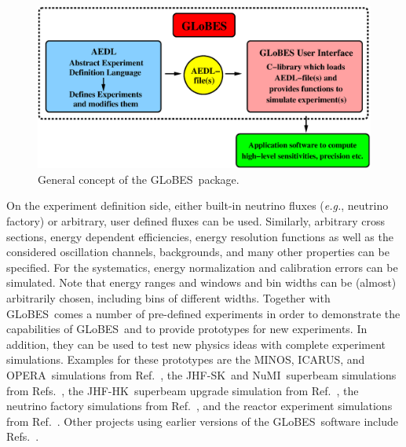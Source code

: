 \documentclass[12pt,a4paper]{article}
\newcommand{\eg}{{\it e.g.}}
\newcommand{\Ref}{Ref.}
\newcommand{\Refs}{Refs.}
\newcommand{\MINOS}{{\sf MINOS}}
\newcommand{\ICARUS}{{\sf ICARUS}}
\newcommand{\OPERA}{{\sf OPERA}}
\newcommand{\JHFSK}{{\sf JHF-SK}}
\newcommand{\NUMI }{{\sf NuMI}}
\newcommand{\JHFHK}{{\sf JHF-HK}}
\newcommand{\GLOBES}{{\sf GLoBES}}
\begin{document}
\begin{figure}[t]
\begin{center}
\includegraphics[width=14cm]{GLOBES}
\end{center}
\caption{\label{fig:GLOBES} General concept of the \GLOBES\ package.}
\end{figure}

On the experiment definition side, either built-in neutrino fluxes
(\eg, neutrino factory) or arbitrary, user defined fluxes can be used. 
Similarly,
arbitrary cross sections, energy dependent efficiencies,
energy resolution functions as well as the considered oscillation channels, 
backgrounds, and many other properties can be specified. 
For the systematics, energy
normalization and calibration errors can be simulated. Note that
energy ranges and windows and bin widths can be
(almost) arbitrarily chosen, including bins of different
widths. Together with \GLOBES\ comes a number of
pre-defined experiments in order to demonstrate the capabilities
of \GLOBES\ and to provide prototypes for new experiments.
In addition, they can be used to test new physics ideas with
complete experiment simulations.
Examples for these prototypes are the \MINOS , \ICARUS , and
\OPERA\ simulations from \Ref~\cite{Huber:2004ug}, the
\JHFSK\ and \NUMI\ superbeam simulations from \Refs~\cite{Huber:2002mx,
Huber:2002rs}, the \JHFHK\ superbeam upgrade simulation from
\Ref~\cite{Huber:2002mx}, the neutrino factory simulations from
\Ref~\cite{Huber:2002mx}, and the reactor experiment simulations from
\Ref~\cite{Huber:2003pm}. Other projects using earlier versions
of the \GLOBES\ software include \Refs~\cite{Huber:2003ak,Ohlsson:2003ip,Winter:2003ye,Antusch:2004yx}.
\end{document}
